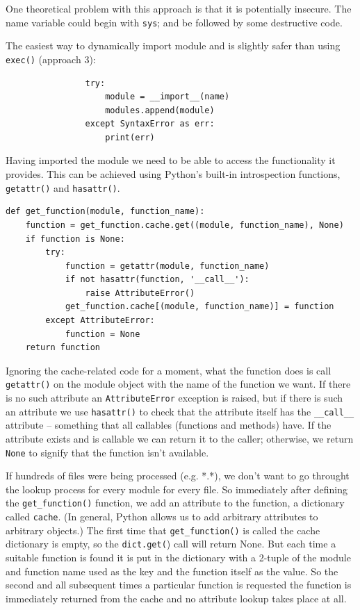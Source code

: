 One theoretical problem with this approach is that it is potentially insecure.
The name variable could begin with \verb|sys|; and be followed by some destructive code.


The easiest way to dynamically import module and is slightly safer than using \verb|exec()| (approach 3):
\begin{lstlisting}
                try:
                    module = __import__(name)
                    modules.append(module)
                except SyntaxError as err:
                    print(err)  
\end{lstlisting}





Having imported the module we need to be able to access the functionality it provides.
This can be achieved using Python's built-in introspection functions, \verb|getattr()| and \verb|hasattr()|.

\begin{lstlisting}
def get_function(module, function_name):
    function = get_function.cache.get((module, function_name), None)
    if function is None:
        try:
            function = getattr(module, function_name)
            if not hasattr(function, '__call__'):
                raise AttributeError()
            get_function.cache[(module, function_name)] = function
        except AttributeError:
            function = None
    return function  
\end{lstlisting}

Ignoring the cache-related code for a moment,
what the function does is call \verb|getattr()| on the module object with the name of the function we want.
If there is no such attribute an \verb|AttributeError| exception is raised,
but if there is such an attribute we use \verb|hasattr()| to check that
the attribute itself has the \verb|__call__| attribute --
something that all callables (functions and methods) have.
If the attribute exists and is callable we can return it to the caller;
otherwise, we return \verb|None| to signify that the function isn’t available.



If hundreds of files were being processed (e.g. *.*),
we don't want to go throught the lookup process for every module for every file.
So immediately after defining the \verb|get_function()| function,
we add an attribute to the function, a dictionary called \verb|cache|.
(In general, Python allows us to add arbitrary attributes to arbitrary objects.)
The first time that \verb|get_function()| is called the cache dictionary is empty,
so the \verb|dict.get(|) call will return None.
But each time a suitable function is found
it is put in the dictionary with a 2-tuple of the module and function name used as the key and
the function itself as the value.
So the second and all subsequent times a particular function is requested
the function is immediately returned from the cache and no attribute lookup takes place at all.




